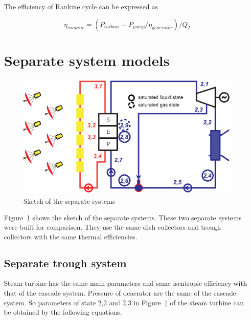 \documentclass{article}
\begin{document}
The efficiency of Rankine cycle can be expressed as

\begin{equation*}
	\eta_{rankine}=(P_{turbine}-P_{pump}/\eta_{generator})/Q_{2}
\end{equation*}

%

\section{Separate system models}

\noindent \begin{figure}[htbp]
\begin{center}
	\includegraphics[width = 0.7\columnwidth]{./graphics/separateSystem}
	\caption{Sketch of the separate systems}
	\label{fig:System-2}
\end{center}
\end{figure}

Figure~\ref{fig:System-2} shows the sketch of the separate systems. These two separate systems were built for comparison. They use the same dish collectors and trough collectors with the same thermal efficiencies.

\subsection{Separate trough system}

Steam turbine has the same main parameters and same isentropic efficiency with that of the cascade system. Pressure of deaerator are the same of the cascade system. So parameters of state 2,2 and 2,3 in Figure~\ref{fig:System-2} of the steam turbine can be obtained by the following equations.
\end{document}
